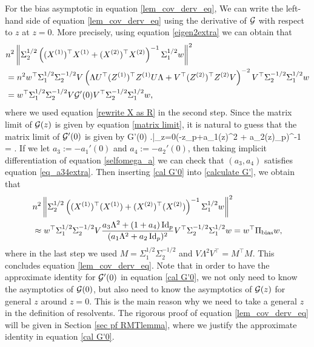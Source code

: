 For the bias asymptotic in equation \eqref{lem_cov_derv_eq}, We can write the left-hand side of equation \eqref{lem_cov_derv_eq} using the derivative of $\cal G$ with respect to $z$ at $z=0$. More precisely, using equation \eqref{eigen2extra} we can obtain that
\begin{align}
&n^2\bignorm{\Sigma_2^{1/2} \bigbrace{ (X^{(1)})^{\top}X^{(1)} + (X^{(2)})^{\top}X^{(2)} }^{-1} \Sigma_1^{1/2} w}^2 \nonumber\\
&=n^2 w^\top \Sigma_1^{1/2}\Sigma_2^{-1/2}V\left(   \Lambda U^\top (Z^{(1)})^\top Z^{(1)} U\Lambda  + V^\top (Z^{(2)})^\top Z^{(2)}V\right)^{-2}V^\top\Sigma_2^{-1/2}\Sigma_1^{1/2}w \nonumber\\
&=  w^\top \Sigma_1^{1/2}\Sigma_2^{-1/2}V\cal G'(0)V^\top\Sigma_2^{-1/2}\Sigma_1^{1/2}w,\label{calculate G'}
\end{align}
where we used equation \eqref{rewrite X as R} in the second step. Since the matrix limit of $\cal G(z)$ is given by equation \eqref{matrix limit}, it is natural to guess that the matrix limit of $\cal G'(0)$ is given by
\be\label{cal G'0}\cal G'(0) \approx \left.\right|_{z=0}(-z\id_p+a_{1}(z)\Lambda^2 + a_{2}(z)\id_p)^{-1} = .\ee
If we let $a_3:=-a_1'(0)$ and $a_4:=-a_2'(0)$, then taking implicit differentiation of equation \eqref{selfomega_a} we can check that $(a_3,a_4)$ satisfies equation \eqref{eq_a34extra}. Then inserting \eqref{cal G'0} into \eqref{calculate G'}, we obtain that
\begin{align}
& n^2\bignorm{\Sigma_2^{1/2} \bigbrace{ (X^{(1)})^{\top}(X^{(1)}) + (X^{(2)})^{\top}(X^{(2)}) }^{-1} \Sigma_1^{1/2} w}^2 \nonumber\\
&\approx  w^\top \Sigma_1^{1/2}\Sigma_2^{-1/2}V\frac{a_3\Lambda^2 +(1+ a_4)\id_p}{(a_{1}\Lambda^2 + a_{2}\id_p)^2}V^\top \Sigma_2^{-1/2}\Sigma_1^{1/2}w= w^{\top} \Pi_\bias w, \label{calculatePibias}
\end{align}
where in the last step we used $M = \Sigma_1^{1/2}\Sigma_2^{-1/2}$ and $V \Lambda^2 V^\top=M^\top M$. This concludes equation \eqref{lem_cov_derv_eq}.
Note that in order to have the approximate identity for $\cal G'(0)$ in equation \eqref{cal G'0}, we not only need to know the asymptotics of $\cal G(0)$, but also need to know the asymptotics of $\cal G(z)$ for general $z$ around $z=0$. This is the main reason why we need to take a general $z$ in the definition of resolvents. The rigorous proof of equation \eqref{lem_cov_derv_eq} will be given in Section \ref{sec pf RMTlemma}, where we justify the approximate identity in equation \eqref{cal G'0}.
